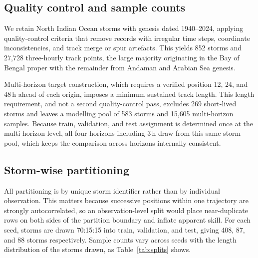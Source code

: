 \documentclass{ametsocv6.1}
\newcommand{\bob}{Bay of Bengal}
\begin{document}
\subsection{Quality control and sample counts}
We retain North Indian Ocean storms with genesis dated 1940--2024, applying
quality-control criteria that remove records with irregular time steps,
coordinate inconsistencies, and track merge or spur artefacts. This yields 852
storms and 27{,}728 three-hourly track points, the large majority originating in
the \bob{} proper with the remainder from Andaman and Arabian Sea genesis.

Multi-horizon target construction, which requires a verified position 12, 24, and
48\,h ahead of each origin, imposes a minimum sustained track length. This length
requirement, and not a second quality-control pass, excludes 269 short-lived
storms and leaves a modelling pool of 583 storms and 15{,}605 multi-horizon
samples. Because train, validation, and test assignment is determined once at the
multi-horizon level, all four horizons including 3\,h draw from this same storm
pool, which keeps the comparison across horizons internally consistent.

\subsection{Storm-wise partitioning}
All partitioning is by unique storm identifier rather than by individual
observation. This matters because successive positions within one trajectory are
strongly autocorrelated, so an observation-level split would place near-duplicate
rows on both sides of the partition boundary and inflate apparent skill. For each
seed, storms are drawn 70:15:15 into train, validation, and test, giving 408, 87,
and 88 storms respectively. Sample counts vary across seeds with the length
distribution of the storms drawn, as Table~\ref{tab:splits} shows.
\end{document}
